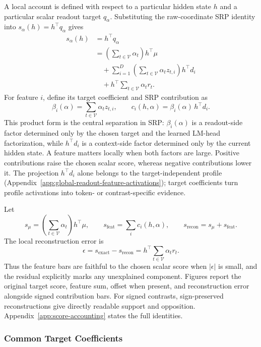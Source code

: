 A local account is defined with respect to a particular hidden state \(h\) and a
particular scalar readout target \(q_\alpha\). Substituting the raw-coordinate
SRP identity into \(s_\alpha(h)=h^\top q_\alpha\) gives
\[
\begin{aligned}
    s_\alpha(h)
    &= h^\top q_\alpha \\
    &=
    \left(\sum_{t\in\mathcal{V}}\alpha_t\right)h^\top\mu \\
    &\quad+
    \sum_{i=1}^{D}
    \left(\sum_{t\in\mathcal{V}}\alpha_t z_{t,i}\right)h^\top d_i \\
    &\quad+
    h^\top\sum_{t\in\mathcal{V}}\alpha_t r_t .
\end{aligned}
\]
For feature \(i\), define its target coefficient and SRP contribution as
\[
    \beta_i(\alpha)
    =
    \sum_{t\in\mathcal{V}}\alpha_t z_{t,i},
    \qquad
    c_i(h,\alpha)
    =
    \beta_i(\alpha)\,h^\top d_i .
\]
This product form is the central separation in SRP:
\(\beta_i(\alpha)\) is a readout-side factor determined only by the chosen
target and the learned LM-head factorization, while \(h^\top d_i\) is a
context-side factor determined only by the current hidden state. A feature
matters locally when both factors are large. Positive contributions raise the
chosen scalar score, whereas negative contributions lower it. The projection
\(h^\top d_i\) alone belongs to the target-independent profile
(Appendix~\ref{app:global-readout-feature-activations}); target coefficients
turn profile activations into token- or contrast-specific evidence.

Let
\[
    s_\mu
    =
    \left(\sum_{t\in\mathcal{V}}\alpha_t\right)h^\top\mu,
    \qquad
    s_{\mathrm{feat}}
    =
    \sum_i c_i(h,\alpha),
    \qquad
    s_{\mathrm{recon}}
    =
    s_\mu+s_{\mathrm{feat}} .
\]
The local reconstruction error is
\[
    \epsilon
    =
    s_{\mathrm{exact}}-s_{\mathrm{recon}}
    =
    h^\top\sum_{t\in\mathcal{V}}\alpha_t r_t .
\]
Thus the feature bars are faithful to the chosen scalar score when
\(|\epsilon|\) is small, and the residual explicitly marks any unexplained
component. Figures report the original target score, feature sum, offset when
present, and reconstruction error alongside signed contribution bars. For
signed contrasts, sign-preserved reconstructions give directly readable support
and opposition. Appendix~\ref{app:score-accounting} states the full identities.

\subsubsection{Common Target Coefficients}

